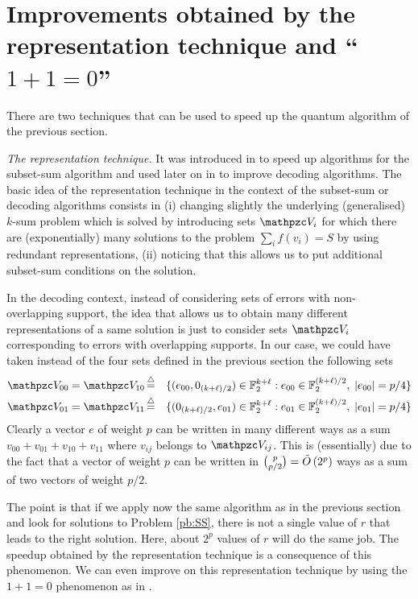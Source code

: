 \section{Improvements obtained by the representation technique and ``$1+1=0$''}
There are two techniques that can be used to
speed up the quantum algorithm of the previous section.


\par{\em The representation technique.} It was introduced in \cite{HJ10} to speed up algorithms for the subset-sum algorithm and
used later on in \cite{MMT11} to improve decoding algorithms. The basic idea of the representation technique in the context of the 
subset-sum or decoding algorithms consists in (i) changing slightly the underlying (generalised) $k$-sum problem which is solved by 
introducing sets $\zV_i$ for which there are (exponentially) many solutions to the problem $\sum_i f(v_i) = S$ by using redundant representations,
 (ii) noticing that this allows us to put additional subset-sum conditions on the solution.

In the decoding context, instead of considering sets of errors with non-overlapping support, the idea that allows us to obtain many 
different representations of a same solution is just to consider sets $\zV_i$ corresponding to errors with overlapping supports. In our case,
we could have taken instead of the four sets defined in the previous section the following sets
\begin{eqnarray*}
\zV_{00}=\zV_{10} &\eqdef &\{(e_{00},0_{(k+\ell)/2})\in \Ft^{k+\ell} : e_{00 }\in \Ft^{(k+\ell)/2},\; |e_{00}|=p/4\} \\
\zV_{01}=\zV_{11} &\eqdef &\{(0_{(k+\ell)/2},e_{01})\in \Ft^{k+\ell} : e_{01 }\in \Ft^{(k+\ell)/2},\; |e_{01}|=p/4\}
\end{eqnarray*}
Clearly a vector $e$ of weight $p$ can be written in many different ways as a sum
$v_{00}+v_{01}+v_{10}+v_{11} $ where $v_{ij}$ belongs to $\zV_{ij}$. This is (essentially) due to the fact that a vector of weight $p$ can be written in $\binom{p}{p/2} = \tilde{O}\left( 2^p \right)$ 
ways as a sum of two vectors  of weight $p/2$.

The point is that if we apply now the same algorithm as in the previous section and look for solutions to Problem \ref{pb:SS}, there is not a single value of $r$
that leads to the right solution. Here, about $2^p$ values of $r$ will do the same job. The speedup obtained by the representation technique 
is a consequence of this phenomenon. We can even improve on this representation technique by using the $1+1=0$ phenomenon as in \cite{BJMM12}.


